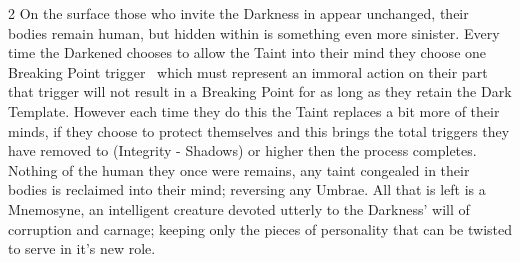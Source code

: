 \begin{multicols}{2}
On the surface those who invite the Darkness in appear unchanged, their bodies remain human, but hidden within is something even more sinister. Every time the Darkened chooses to allow the Taint into their mind they choose one Breaking Point trigger \textemdash\, which must represent an immoral action on their part \textemdash\, that trigger will not result in a Breaking Point for as long as they retain the Dark Template. However each time they do this the Taint replaces a bit more of their minds, if they choose to protect themselves and this brings the total triggers they have removed to (Integrity - Shadows) or higher then the process completes. Nothing of the human they once were remains, any taint congealed in their bodies is reclaimed into their mind; reversing any Umbrae. All that is left is a Mnemosyne, an intelligent creature devoted utterly to the Darkness' will of corruption and carnage; keeping only the pieces of personality that can be twisted to serve in it's new role.




\end{multicols}
